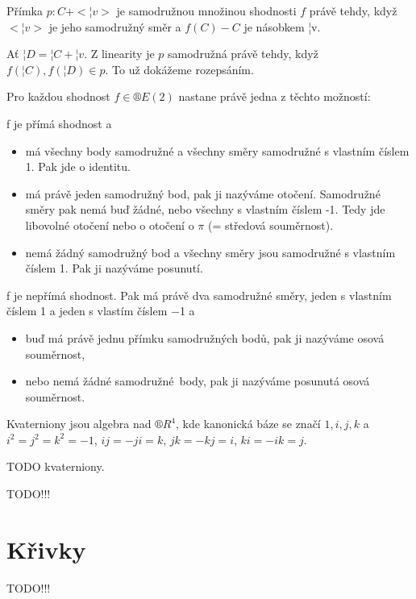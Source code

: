 \documentclass[12pt]{article}					%
\begin{document}
\begin{lemma}
	Přímka $p: C + <¦v>$ je samodružnou množinou shodnosti $f$ právě tehdy, když $<¦v>$ je jeho samodružný směr a $f(C) - C$ je násobkem ¦v.

	\begin{dukazin}
		Ať $¦D = ¦C + ¦v$. Z linearity je $p$ samodružná právě tehdy, když $f(¦C), f(¦D) \in p$. To už dokážeme rozepsáním.
	\end{dukazin}
\end{lemma}

\begin{veta}
	Pro každou shodnost $f \in ®E(2)$ nastane právě jedna z těchto možností:

	f je přímá shodnost a
	\begin{itemize}
		\item má všechny body samodružné a všechny směry samodružné s vlastním číslem 1. Pak jde o identitu.
		\item má právě jeden samodružný bod, pak ji nazýváme otočení. Samodružné směry pak nemá buď žádné, nebo všechny s vlastním číslem -1. Tedy jde libovolné otočení nebo o otočení o $\pi$ (= středová souměrnost).
		\item nemá žádný samodružný bod a všechny směry jsou samodružné s vlastním číslem 1. Pak ji nazýváme posunutí.
	\end{itemize}

	f je nepřímá shodnost. Pak má právě dva samodružné směry, jeden s vlastním číslem 1 a jeden s vlastím číslem −1 a
	\begin{itemize}
		\item buď má právě jednu přímku samodružných bodů, pak ji nazýváme osová souměrnost,
		\item nebo nemá žádné samodružné body, pak ji nazýváme posunutá osová souměrnost.
	\end{itemize}
\end{veta}


\begin{definice}[Kvaterniony]
	Kvaterniony jsou algebra nad $®R^4$, kde kanonická báze se značí $1, i, j, k$ a $i^2=j^2=k^2 = -1$, $ij=-ji=k$, $jk=-kj=i$, $ki=-ik=j$.
\end{definice}

TODO kvaterniony.


TODO!!!
\section{Křivky}
TODO!!!
\end{document}

